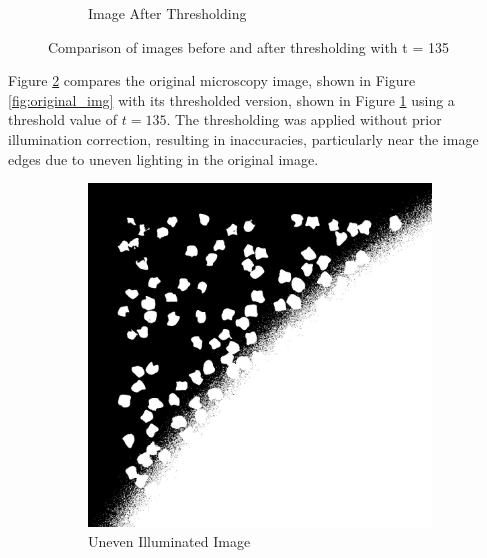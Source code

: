 \documentclass[%
	a4paper, %
	12pt, %
	english, %
	bibtotoc %
]{scrartcl}
\begin{document}
\begin{figure}[H]
\begin{subfigure}[b]{0.3\textwidth}
        \caption{Image After Thresholding}
\label{fig:thresholded_img_without_illumination}
    \end{subfigure}
    \caption{Comparison of images before and after thresholding with t = 135}
    \label{fig:comparison_before_illumination}
\end{figure}

Figure \ref{fig:comparison_before_illumination} compares the original microscopy image, shown in Figure \ref{fig:original_img} with its thresholded version, shown in Figure \ref{fig:thresholded_img_without_illumination}  using a threshold value of \( t = 135 \). The thresholding was applied without prior illumination correction, resulting in inaccuracies, particularly near the image edges due to uneven lighting in the original image.

\begin{figure}[H]
    \centering
    \begin{subfigure}[b]{0.3\textwidth}
        \centering
        \includegraphics[width=\textwidth]{uneven_illuminated img.jpg}
        \caption{Uneven Illuminated Image}
        \label{fig:uneven_illuminated_img}
    \end{subfigure}
    \hspace{1cm} %
    \begin{subfigure}[b]{0.3\textwidth}

\end{subfigure}
\end{figure}
\end{document}
